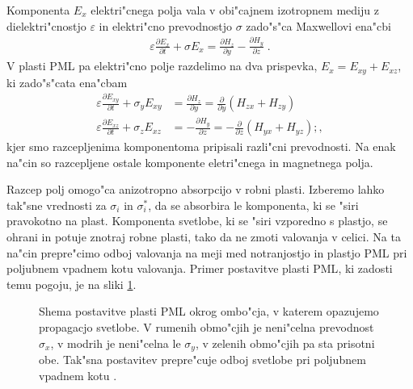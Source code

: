 \documentclass[12pt,twoside,openright,final]{report}
\newcommand{\odvod}[2]{\frac{\partial #1}{\partial #2}}
\newcommand{\eps}{\varepsilon}
\begin{document}
Komponenta $E_x$ elektri"cnega polja vala v obi"cajnem izotropnem mediju z dielektri"cnostjo $\eps$ in elektri"cno prevodnostjo $\sigma$ zado"s"ca Maxwellovi ena"cbi
\begin{align}
 \eps \odvod{E_x}{t} + \sigma E_x = \odvod{H_z}{y} - \odvod{H_y}{z}\;.
\end{align}
V plasti \acs{PML} pa elektri"cno polje razdelimo na dva prispevka, $E_x = E_{xy} + E_{xz}$, ki zado"s"cata ena"cbam
\begin{align}
 \eps \odvod{E_{xy}}{t} + \sigma_y E_{xy} &= \odvod{H_z}{y} = \odvod{}{y}(H_{zx} + H_{zy}) \\
 \eps \odvod{E_{xz}}{t} + \sigma_z E_{xz} &= -\odvod{H_y}{z} = -\odvod{}{z}(H_{yx} + H_{yz});,
\end{align}
kjer smo razcepljenima komponentoma pripisali razli"cni prevodnosti. 
Na enak na"cin so razcepljene ostale komponente eletri"cnega in magnetnega polja. 

Razcep polj omogo"ca anizotropno absorpcijo v robni plasti. 
Izberemo lahko tak"sne vrednosti za $\sigma_i$ in $\sigma^\ast_i$, da se absorbira le komponenta, ki se "siri pravokotno na plast. 
Komponenta svetlobe, ki se "siri vzporedno s plastjo, se ohrani in potuje znotraj robne plasti, tako da ne zmoti valovanja v celici. 
Na ta na"cin prepre"cimo odboj valovanja na meji med notranjostjo in plastjo \acs{PML} pri poljubnem vpadnem kotu valovanja. 
Primer postavitve plasti \acs{PML}, ki zadosti temu pogoju, je na sliki \ref{fig:pml-shema}. 

\begin{figure}[!htbp]
 \centering
 \def\svgwidth{.4\textwidth}
 
 \caption{Shema postavitve plasti \acs{PML} okrog ombo"cja, v katerem opazujemo propagacjo svetlobe. V rumenih obmo"cjih je neni"celna prevodnost $\sigma_x$, v modrih je neni"celna le $\sigma_y$, v zelenih obmo"cjih pa sta prisotni obe. Tak"sna postavitev prepre"cuje odboj svetlobe pri poljubnem vpadnem kotu \cite{taflove}. }
 \label{fig:pml-shema}
\end{figure}
\end{document}
